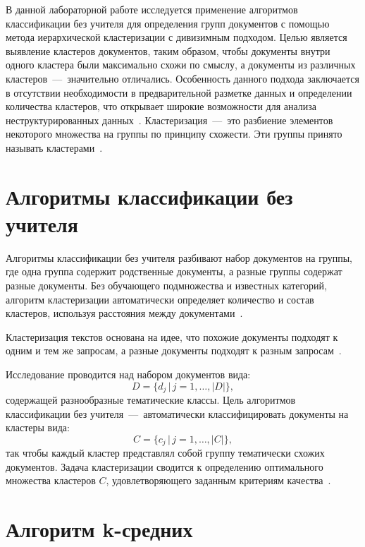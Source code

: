 В данной лабораторной работе исследуется применение алгоритмов классификации без учителя для определения групп документов с помощью метода иерархической кластеризации с дивизимным подходом. 
Целью является выявление кластеров документов, таким образом, чтобы документы внутри одного кластера были максимально схожи по смыслу, а документы из различных кластеров~---~значительно отличались.
Особенность данного подхода заключается в отсутствии необходимости в предварительной разметке данных и определении количества кластеров, что открывает широкие возможности для анализа неструктурированных данных~\cite{main-book}.
Кластеризация~---~это разбиение элементов некоторого множества на группы по принципу схожести. Эти группы принято называть кластерами~\cite{defcluctering}.


\section{Алгоритмы классификации без учителя}

Алгоритмы классификации без учителя разбивают набор документов на группы, где одна группа содержит родственные документы, а разные группы содержат разные документы. 
Без обучающего подмножества и известных категорий, алгоритм кластеризации автоматически определяет количество и состав кластеров, используя расстояния между документами~\cite{main-book}.

Кластеризация текстов основана на идее, что похожие документы подходят к одним и тем же запросам, а разные документы подходят к разным запросам~\cite{main-book}.

Исследование проводится над набором документов вида:
\begin{equation}\label{eq:doc}
	D = \{d_j\,|\,j=1,\ldots,|D|\},
\end{equation}
содержащей разнообразные тематические классы.
Цель алгоритмов классификации без учителя~---~автоматически классифицировать документы на кластеры вида:
\begin{equation}\label{eq:claster}
	C = \{c_j\,|\,j=1,\ldots,|C|\},
\end{equation}
так чтобы каждый кластер представлял собой группу тематически схожих документов. 
Задача кластеризации сводится к определению оптимального множества кластеров \( C \), удовлетворяющего заданным критериям качества~\cite{main-book}.

\section{Алгоритм k-средних}

